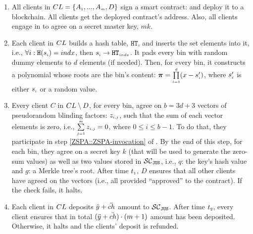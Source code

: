 \begin{enumerate}[leftmargin=4mm]


\item\label{gen-FPSI-cont} All clients in ${CL}=\{ A_{\scriptscriptstyle 1},...,   A_{\scriptscriptstyle m},  D\}$ sign a smart contract: \scf and deploy it to a blockchain. All clients get the deployed contract's address. Also, all clients engage in \ct to agree on a secret master key, $mk$.

\item \label{encode-encrypt} Each client in ${CL}$  builds a  hash table,  $\mathtt{HT}$, and inserts the set elements into  it, i.e.,  $\forall i: \mathtt{H}( s_{\scriptscriptstyle i})={indx}$, then $ s_{\scriptscriptstyle i}\rightarrow \mathtt{HT}_{\scriptscriptstyle indx}$. It pads every bin with random dummy elements to $d$ elements (if needed). Then,  for every bin, it constructs a polynomial whose roots are the bin's content: $\bm\pi=\prod\limits^{\scriptscriptstyle d}_{\scriptscriptstyle i=1} (x-s'_{\scriptscriptstyle i})$, where $s'_{\scriptscriptstyle i}$ is either $s_{\scriptscriptstyle i}$ or a random value. 
%
\item \label{ZSPA} Every client $ C$ in ${CL}\setminus D$, for every bin, agree on $b=3d+3$ vectors of pseudorandom blinding factors: $z_{\scriptscriptstyle i,j}$, such that the sum of each vector elements is zero, i.e., $\sum\limits^{\scriptscriptstyle m}_{\scriptscriptstyle j=1}z_{\scriptscriptstyle i,j}=0$, where $0\leq i\leq b-1$. To do that, they participate in step \ref{ZSPA::ZSPA-invocation} of \zspaa. By the end of this step, for each bin, they agree on a secret key $k$ (that will be used to generate the zero-sum values) as well as two values stored in $\mathcal{SC}_{\mathtt{JUS}}$, i.e., $q$: the key's hash value and $g$: a Merkle tree's root. After time $t_{\scriptscriptstyle 1}$,  $D$ ensures that all other clients have agreed on the vectors (i.e., all provided ``approved''  to the contract). If the check fails, it halts. 
%
\item\label{F-PSI::each-client-deposit} Each client in ${CL}$ deposits $\ddot{y}+\ddot{ch}$ amount to $\mathcal{SC}_{\mathtt{JUS}}$. After time $t_{\scriptscriptstyle 2}$, every client ensures that in total $(\ddot{y}+\ddot{ch})\cdot (m+1)$ amount has been deposited. Otherwise, it halts and the clients' deposit is refunded. 








\end{enumerate}
